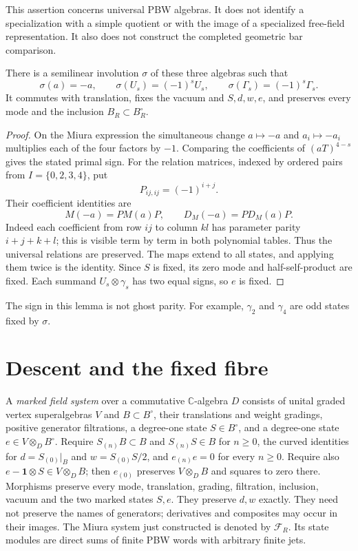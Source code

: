 This assertion concerns universal PBW algebras. It does not identify a
specialization with a simple quotient or with the image of a
specialized free-field representation. It also does not construct the
completed geometric bar comparison.

\begin{lemma}\label{rpd:lem:symmetry}
There is a semilinear involution $\sigma$ of these three algebras
such that
\[
 \sigma(a)=-a,\qquad \sigma(U_s)=(-1)^sU_s,
 \qquad \sigma(\Gamma_s)=(-1)^s\Gamma_s.
\]
It commutes with translation, fixes the vacuum and $S,d,w,e$, and
preserves every mode and the inclusion $B_R\subset B_R^\circ$.
\end{lemma}
\begin{proof}
On the Miura expression the simultaneous change $a\mapsto-a$ and
$a_i\mapsto-a_i$ multiplies each of the four factors by $-1$.
Comparing the coefficients of $(aT)^{4-s}$ gives the stated primal
sign. For the relation matrices, indexed by ordered pairs from
$I=\{0,2,3,4\}$, put
\[
 P_{ij,ij}=(-1)^{i+j}.
\]
Their coefficient identities are
\[
 M(-a)=PM(a)P,\qquad D_M(-a)=PD_M(a)P.
\]
Indeed each coefficient from row $ij$ to column $kl$ has parameter
parity $i+j+k+l$; this is visible term by term in both polynomial
tables. Thus the universal relations are preserved. The maps extend
to all states, and applying them twice is the identity. Since $S$ is
fixed, its zero mode and half-self-product are fixed. Each summand
$U_s\otimes\gamma_s$ has two equal signs, so $e$ is fixed.\qedhere
\end{proof}

The sign in this lemma is not ghost parity. For example,
$\gamma_2$ and $\gamma_4$ are odd states fixed by $\sigma$.

\section{Descent and the fixed fibre}

\begin{definition}\label{rpd:def:system}
A \emph{marked field system} over a commutative $\mathbb C$-algebra $D$
consists of unital graded vertex superalgebras $V$ and
$B\subset B^\circ$, their translations and weight gradings, positive
generator filtrations, a degree-one state $S\in B^\circ$, and a
degree-one state $e\in V\otimes_D B^\circ$.
Require $S_{(n)}B\subset B$ and $S_{(n)}S\in B$ for $n\geq0$,
the curved identities for $d=S_{(0)}|_B$ and
$w=S_{(0)}S/2$, and $e_{(n)}e=0$ for every $n\geq0$.
Require also $e-\mathbf1\otimes S\in V\otimes_D B$; then
$e_{(0)}$ preserves $V\otimes_D B$ and squares to zero there.
Morphisms preserve every mode, translation, grading, filtration,
inclusion, vacuum and the two marked states $S,e$.
They preserve $d,w$ exactly. They need not preserve the names of
generators; derivatives and composites may occur in their images.
The Miura system just constructed is denoted by $\mathcal F_R$.
Its state modules are direct sums of finite PBW words with arbitrary
finite jets.
\end{definition}

